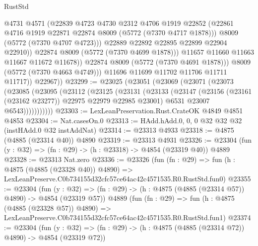 \begin{lexlean}{RustStd}
\begin{coremodule}
                          @4731
                          @4571
                          (@22839
                            @4723
                            @4730
                            @2312
                            @4706
                            @1919
                            @22852
                            (@22861 @4716 @1919 @22871 @22874 @8009 (@5772 (@7370 @4717 @1878)))
                            @8009
                            (@5772 (@7370 @4707 @4723)))
                          @22889
                          @22892
                          @22895
                          @22899
                          @22904
                          @22910))
                      @22874
                      @8009
                      (@5772 (@7370 @4699 @1878)))
                    @11657
                    @11660
                    @11663
                    @11667
                    @11672
                    @11678))
                @22874
                @8009
                (@5772 (@7370 @4691 @1878)))
              @8009
              (@5772 (@7370 @4663 @4749)))
            @11696
            @11699
            @11702
            @11706
            @11711
            @11717))
        @22967))
@23299 := @23025
    (@23051
      (@23069
        (@23071
          (@23073
            (@23085
              (@23095
                (@23112
                  (@23125
                    (@23131
                      (@23133
                        (@23147
                          (@23156 (@23161 (@23162 @23277)) @22975 @22979 @22985 @23001)
                          @6531
                          @23007
                          @6543)))))))))))
@23303 := LexLeanPreservation.Rust.CrateOK @4849 @4851 @4853
@23304 := Nat.casesOn.{0}
@23313 := HAdd.hAdd.{0, 0, 0} @32 @32 @32 (instHAdd.{0} @32 instAddNat)
@23314 := @23313 @4933
@23318 := @4875 (@4885 (@23314 @40)) @4890
@23319 := @23313 @4931
@23326 := @23304 (fun (y : @32) => (fn : @29) -> (h : @23318) -> @4854 (@23319 @40)) @4889
@23328 := @23313 Nat.zero
@23336 := @23326
    (fun (fn : @29) =>
    fun (h : @4875 (@4885 (@23328 @40)) @4890) =>
    LexLeanPreserve.C0b734155d32cfc57ce64ac42c4571535.R0.RustStd.fun0)
@23355 := @23304
    (fun (y : @32) => (fn : @29) -> (h : @4875 (@4885 (@23314 @57)) @4890) -> @4854 (@23319 @57))
    @4889
    (fun (fn : @29) =>
    fun (h : @4875 (@4885 (@23328 @57)) @4890) =>
    LexLeanPreserve.C0b734155d32cfc57ce64ac42c4571535.R0.RustStd.fun1)
@23374 := @23304
    (fun (y : @32) => (fn : @29) -> (h : @4875 (@4885 (@23314 @72)) @4890) -> @4854 (@23319 @72))

\end{coremodule}
\end{lexlean}
